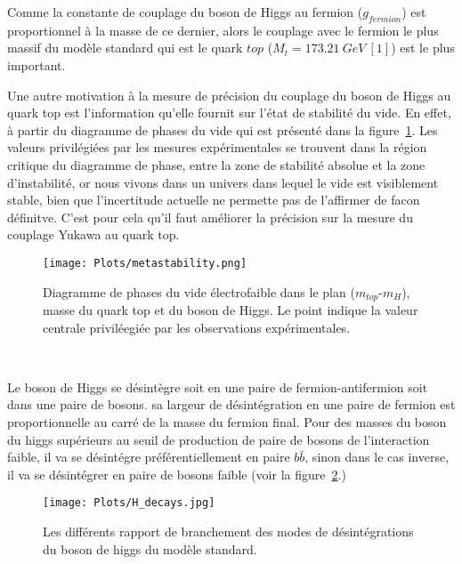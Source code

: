 Comme la constante de couplage du boson de Higgs au fermion ($g_{fermion}$) est proportionnel \`a la masse de ce dernier, alors le couplage avec le fermion le plus massif du mod\`ele standard qui est le quark $top$ ($M_{t}=173.21 \ GeV \ [1]$) est le plus important.
~\par Une autre motivation \`a la mesure de pr\'ecision du couplage du boson de Higgs au quark top est l'information qu'elle fournit sur l'\'etat de stabilit\'e du vide. En effet, \`a partir du diagramme de phases du vide qui est pr\'esent\'e dans la figure~\ref{figure:1.1}. Les valeurs privil\'egi\'ees par les mesures exp\'erimentales se trouvent dans la r\'egion critique du diagramme de phase, entre la zone de stabilit\'e absolue et la zone d'instabilit\'e,  or nous vivons dans un univers dans lequel le vide est visiblement stable, bien que l'incertitude actuelle ne permette pas de l'affirmer de facon d\'efinitve. C'est pour cela qu'il faut am\'eliorer la pr\'ecision sur la mesure du couplage Yukawa au quark top.

\begin{figure}[h!]
\centering
\texttt{[image: Plots/metastability.png]}
\caption{Diagramme de phases du vide \'electrofaible dans le plan ($m_{top}$-$m_{H}$), masse du quark top et du boson de Higgs. Le point indique la valeur centrale privil\'eegi\'ee par les observations exp\'erimentales.}
\label{figure:1.1}
\end{figure}

~\par Le boson de Higgs se d\'esint\`egre soit en une paire de fermion-antifermion soit dans une paire de bosons. sa largeur de d\'esint\'egration en une paire de fermion est proportionnelle au carr\'e de la masse du fermion final. Pour des masses du boson du higgs sup\'erieurs au seuil de production de paire de bosons de l'interaction faible, il va se d\'esint\'egre pr\'ef\'erentiellement en paire $b\bar{b}$, sinon dans le cas inverse, il va se d\'esint\'egrer en paire de bosons faible (voir la figure~\ref{figure:1.2}.)

\begin{figure}[h!]
\centering
\texttt{[image: Plots/H\_decays.jpg]}
\caption{Les diff\'erents rapport de branchement des modes de d\'esint\'egrations du boson de higgs du mod\`ele standard.}
\label{figure:1.2}
\end{figure}